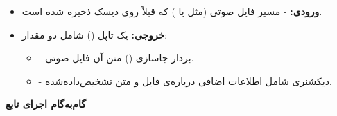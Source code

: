 \documentclass{article}
\begin{document}
\begin{itemize}
    \item \textbf{ورودی:}  - مسیر فایل صوتی (مثل  یا ) که قبلاً روی دیسک ذخیره شده است.
    \item \textbf{خروجی:} یک تاپل () شامل دو مقدار:
    \begin{itemize}
        \item {} - بردار جاسازی () متن آن فایل صوتی.
        \item {} - دیکشنری شامل اطلاعات اضافی درباره‌ی فایل و متن تشخیص‌داده‌شده.
    \end{itemize}
\end{itemize}

\textbf{گام‌به‌گام اجرای تابع}
\end{document}
